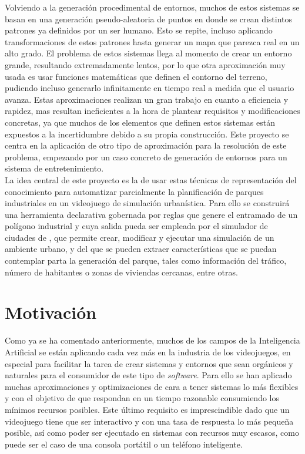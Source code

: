 Volviendo a la generación procedimental de entornos, muchos de estos sistemas se basan en una generación pseudo-aleatoria de puntos en donde se crean distintos patrones ya definidos por un ser humano. Esto se repite, incluso aplicando transformaciones de estos patrones hasta generar un mapa que parezca real en un alto grado. El problema de estos sistemas llega al momento de crear un entorno grande, resultando extremadamente lentos, por lo que otra aproximación muy usada es usar funciones matemáticas que definen el contorno del terreno, pudiendo incluso generarlo infinitamente en tiempo real a medida que el usuario avanza. Estas aproximaciones realizan un gran trabajo en cuanto a eficiencia y rapidez, mas resultan ineficientes a la hora de plantear requisitos y modificaciones concretas, ya que muchos de los elementos que definen estos sistemas están expuestos a la incertidumbre debido a su propia construcción. Este proyecto se centra en la aplicación de otro tipo de aproximación para la resolución de este problema, empezando por un caso concreto de generación de entornos para un sistema de entretenimiento. \\

La idea central de este proyecto es la de usar estas técnicas de representación del conocimiento para automatizar parcialmente la planificación de parques industriales en un videojuego de simulación urbanística. Para ello se construirá una herramienta declarativa gobernada por reglas que genere el entramado de un polígono industrial y cuya salida pueda ser empleada por el simulador de ciudades de \cities, que permite crear, modificar y ejecutar una simulación de un ambiente urbano, y del que se pueden extraer características que se puedan contemplar parta la generación del parque, tales como información del tráfico, número de habitantes o zonas de viviendas cercanas, entre otras.

\section{Motivación}

Como ya se ha comentado anteriormente, muchos de los campos de la Inteligencia Artificial se están aplicando cada vez más en la industria de los videojuegos, en especial para facilitar la tarea de crear sistemas y entornos que sean orgánicos y naturales para el consumidor de este tipo de \textit{software}. Para ello se han aplicado muchas aproximaciones y optimizaciones de cara a tener sistemas lo más flexibles y con el objetivo de que respondan en un tiempo razonable consumiendo los mínimos recursos posibles. Este último requisito es imprescindible dado que un videojuego tiene que ser interactivo y con una tasa de respuesta lo más pequeña posible, así como poder ser ejecutado en sistemas con recursos muy escasos, como puede ser el caso de una consola portátil o un teléfono inteligente. \\

